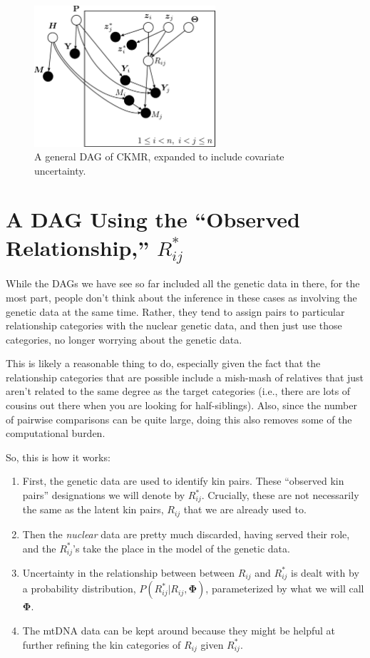 \documentclass[11pt, oneside]{article}   	%
\newcommand{\BPhi}{\mathbf{\Phi}}
\begin{document}
\begin{figure}
\begin{center}
\includegraphics[width=0.6\textwidth]{images/general-dag-2.pdf}
\end{center}
\caption{A general DAG of CKMR, expanded to include covariate uncertainty.}
\label{fig:covar-uncert}
\end{figure}

\section{A DAG Using the ``Observed Relationship,'' $R_{ij}^*$}

While the DAGs we have see so far included all the genetic data in there, for the most part,
people don't think about the inference in these cases as involving the genetic data at the same
time.  Rather, they tend to assign pairs to particular relationship categories with the nuclear genetic
data, and then just use those categories, no longer worrying about the genetic data.

This is likely a reasonable thing to do, especially given the fact that the relationship categories that are
possible include a mish-mash of relatives that just aren't related to the same degree as the target categories 
(i.e., there are lots of cousins out there when you are looking for half-siblings).  Also, since the number of pairwise
comparisons can be quite large, doing this also removes some of the computational burden.

So, this is how it works:
\begin{enumerate}
\item First, the genetic data are used to identify kin pairs.  These ``observed kin pairs'' designations
we will denote by $R_{ij}^*$.  Crucially, these are not necessarily the same as the latent kin pairs,
$R_{ij}$ that we are already used to.
\item Then the {\em nuclear} data are pretty much discarded, having served their role, and the $R_{ij}^*$'s take the
place in the model of the genetic data.
\item Uncertainty in the relationship between between $R_{ij}$ and $R^*_{ij}$ is dealt with by
a probability distribution, $P(R^*_{ij}| R_{ij}, \BPhi)$, parameterized by what we will call $\BPhi$.
\item The mtDNA data can be kept around because they might be helpful at further refining the
kin categories of $R_{ij}$ given $R_{ij}^*$.
\end{enumerate}
\end{document}
